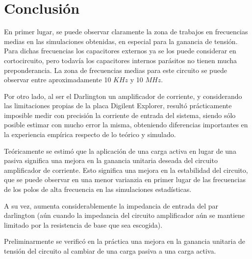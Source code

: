 \chapter{Conclusión}
En primer lugar, se puede observar claramente la zona de trabajos en frecuencias medias en las simulaciones obtenidas, en especial para la 
ganancia de tensión. Para dichas frecuencias los capacitores externos ya se los puede considerar en cortocircuito, pero todavía los capacitores 
internos parásitos no tienen mucha preponderancia. La zona de frecuencias medias para este circuito se puede observar entre aproximadamente 
10 $KHz$ y 10 $MHz$.

Por otro lado, al ser el Darlington un amplificador de corriente, y considerando las limitaciones propias de la placa Digilent Explorer,
 resultó prácticamente imposible medir con precisión la corriente de entrada del  sistema, siendo sólo posible estimar con mucho error la misma,
  obteniendo diferencias importantes en la experiencia empírica respecto de
 lo teórico y simulado.


Teóricamente se estimó que la aplicación de una carga activa en lugar de una pasiva significa una mejora en la ganancia unitaria deseada del circuito amplificador de corriente. Esto significa una mejora en la estabilidad del circuito, que se puede observar en una menor varianzia en primer lugar de las frecuencias de los polos de alta frecuencia en las simulaciones estadísticas.

A su vez, aumenta considerablemente la impedancia de entrada del par darlington (aún cuando la impedancia del circuito amplificador aún se mantiene limitado por la resistencia de base que sea escogida).

Preliminarmente se verificó en la práctica una mejora en la ganancia unitaria de tensión del circuito al cambiar de una carga pasiva a una carga activa.